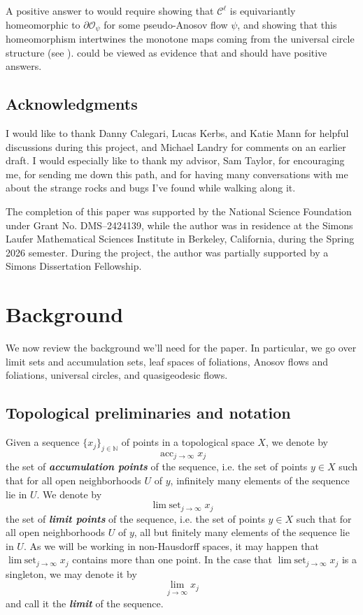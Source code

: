 \documentclass[11pt]{amsart}
\newcommand{\mc}{\mathcal}
\newcommand{\N}{\mathbb{N}}
\newcommand{\orb}{\mathcal{O}}
\newcommand{\defn}[1]{\textbf{\emph{#1}}}
\DeclareMathOperator*{\limset}{\mathrm{lim}\; \mathrm{set}}
\DeclareMathOperator*{\acset}{\mathrm{acc}}
\numberwithin{equation}{section}
\theoremstyle{definition}
\begin{document}
A positive answer to  would require showing that $\mc C^\ell$ is equivariantly homeomorphic to $\partial\orb_\psi$ for some pseudo-Anosov flow $\psi$, and showing that this homeomorphism intertwines the monotone maps coming from the universal circle structure (see ).  could be viewed as evidence that \cite[Conjecture 1.5]{LMT_UC} and  should have positive answers.

\subsection*{Acknowledgments}
I would like to thank Danny Calegari, Lucas Kerbs, and Katie Mann for helpful discussions during this project, and Michael Landry for comments on an earlier draft. I would especially like to thank my advisor, Sam Taylor, for encouraging me, for sending me down this path, and for having many conversations with me about the strange rocks and bugs I've found while walking along it.

The completion of this paper was supported by the National Science Foundation under Grant No. DMS–2424139, while the author was in residence at the Simons Laufer Mathematical Sciences Institute in Berkeley, California, during the Spring 2026 semester. During the project, the author was partially supported by a Simons Dissertation Fellowship.

\section{Background}\label{sec:background}


We now review the background we'll need for the paper. In particular, we go over limit sets and accumulation sets, leaf spaces of foliations, Anosov flows and foliations, universal circles, and quasigeodesic flows. 

\subsection{Topological preliminaries and notation}\label{sec:limit_background}
Given a sequence $\{x_j\}_{j\in\N}$ of points in a topological space $X$, we denote by 
\[
\acset_{j\to\infty}x_j
\]
the set of \defn{accumulation points} of the sequence, i.e. the set of points $y\in X$ such that for all open neighborhoods $U$ of $y$, infinitely many elements of the sequence lie in $U$. We denote by 
\[
\limset_{j\to\infty}x_j
\]
the set of \defn{limit points} of the sequence, i.e. the set of points $y\in X$ such that for all open neighborhoods $U$ of $y$, all but finitely many elements of the sequence lie in $U$. As we will be working in non-Hausdorff spaces, it may happen that 
\(
\limset_{j\to\infty}x_j
\)
contains more than one point. In the case that 
\(
\limset_{j\to\infty}x_j
\) 
is a singleton, we may denote it by 
\[
\lim_{j\to\infty}x_j
\] 
and call it the \defn{limit} of the sequence.
\end{document}

